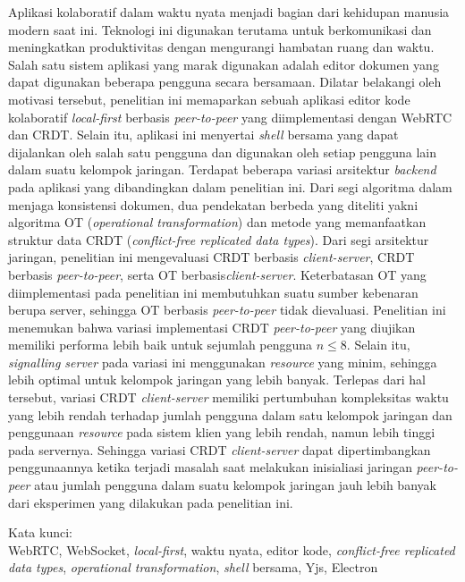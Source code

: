 \noindent Aplikasi kolaboratif dalam waktu nyata menjadi bagian dari kehidupan manusia modern saat ini. Teknologi ini digunakan terutama untuk berkomunikasi dan meningkatkan produktivitas dengan mengurangi hambatan ruang dan waktu. Salah satu sistem aplikasi yang marak digunakan adalah editor dokumen yang dapat digunakan beberapa pengguna secara bersamaan. Dilatar belakangi oleh motivasi tersebut, penelitian ini memaparkan sebuah aplikasi editor kode kolaboratif \textit{local-first} berbasis \textit{peer-to-peer} yang diimplementasi dengan WebRTC dan CRDT. Selain itu, aplikasi ini menyertai \textit{shell} bersama yang dapat dijalankan oleh salah satu pengguna dan digunakan oleh setiap pengguna lain dalam suatu kelompok jaringan. Terdapat beberapa variasi arsitektur \textit{backend} pada aplikasi yang dibandingkan dalam penelitian ini. Dari segi algoritma dalam menjaga konsistensi dokumen, dua pendekatan berbeda yang diteliti yakni algoritma OT (\textit{operational transformation}) dan metode yang memanfaatkan struktur data CRDT (\textit{conflict-free replicated data types}). Dari segi arsitektur jaringan, penelitian ini mengevaluasi CRDT berbasis \textit{client-server}, CRDT berbasis \textit{peer-to-peer}, serta OT berbasis\textit{client-server}. Keterbatasan OT yang diimplementasi pada penelitian ini membutuhkan suatu sumber kebenaran berupa server, sehingga OT berbasis \textit{peer-to-peer} tidak dievaluasi. Penelitian ini menemukan bahwa variasi implementasi CRDT \textit{peer-to-peer} yang diujikan memiliki performa lebih baik untuk sejumlah pengguna $n \leq 8$. Selain itu, \textit{signalling server} pada variasi ini menggunakan \textit{resource} yang minim, sehingga lebih optimal untuk kelompok jaringan yang lebih banyak. Terlepas dari hal tersebut, variasi CRDT \textit{client-server} memiliki pertumbuhan kompleksitas waktu yang lebih rendah terhadap jumlah pengguna dalam satu kelompok jaringan dan penggunaan \textit{resource} pada sistem klien yang lebih rendah, namun lebih tinggi pada servernya. Sehingga variasi CRDT \textit{client-server} dapat dipertimbangkan penggunaannya ketika terjadi masalah saat melakukan inisialiasi jaringan \textit{peer-to-peer} atau jumlah pengguna dalam suatu kelompok jaringan jauh lebih banyak dari eksperimen yang dilakukan pada penelitian ini.\\

\vspace*{0.2cm}

\noindent Kata kunci: \\ WebRTC, WebSocket, \textit{local-first}, waktu nyata, editor kode, \textit{conflict-free replicated data types}, \textit{operational transformation}, \textit{shell} bersama, Yjs, Electron \\

\newpage
